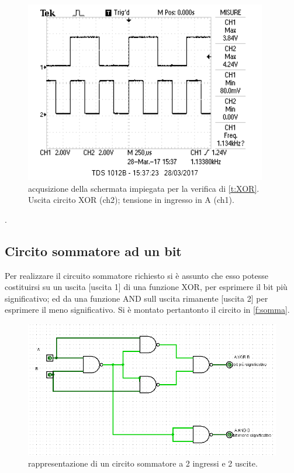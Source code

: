 	\begin{figure}[hb]
		\centering
		\includegraphics[scale=0.35]{../Figs-Tabs/xor.png}
		\caption{acqusizione della schermata impiegata per la verifica di \tablename{ \ref{t:XOR}}.
			Uscita circito XOR (ch2); tensione in ingresso in A (ch1).
		}
		\label{f:osci-xor}
	\end{figure}.
\subsection{Circito sommatore ad un bit}	
	Per realizzare il circuito sommatore richiesto si è assunto
	che esso potesse costituirsi su un uscita [uscita 1] di una funzione XOR, per esprimere il bit più significativo;
	ed da una funzione AND sull uscita rimanente [uscita 2] per esprimere il meno significativo.
	Si è montato pertantonto il circito in \figurename{ \ref{f:somma}}.
		\begin{figure}[htb]
		\includegraphics[scale=1.0]{../Figs-Tabs/somma.png}
		\caption{rappresentazione di un circito sommatore a 2 ingressi e 2 uscite.}
	\end{figure}\label{f:somma}
	
